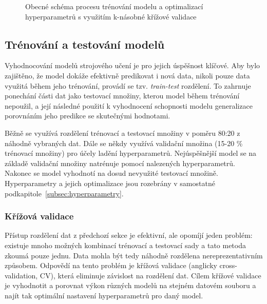 \begin{figure}[!htb]
\begin{center}
        \caption{Obecné schéma procesu trénování modelu a optimalizací
            hyperparametrů s využitím k-násobné křížové
            validace~\cite{crossvalidation}}
        \label{fig:cross-validation}
    \end{center}
\end{figure}


\subsection{Trénování a testování modelů}
Vyhodnocování modelů strojového učení je pro jejich úspěšnost klíčové. Aby bylo
zajištěno, že model dokáže efektivně predikovat i nová data, nikoli pouze data
využitá během jeho trénování, provádí se tzv. \emph{train-test} rozdělení. To
zahrnuje ponechání části dat jako testovací množiny, kterou model během
trénování nepoužil, a její následné použití k vyhodnocení schopnosti modelu
generalizace porovnáním jeho predikce se skutečnými hodnotami.

Běžně se využívá rozdělení trénovací a testovací množiny v poměru 80:20 z
náhodně vybraných dat. Dále se někdy využívá validační množina (15-20 \%
trénovací množiny) pro účely ladění hyperparametrů. Nejúspěšnější model se na
základě validační množiny natrénuje pomocí nalezených hyperparametrů. Nakonec se
model vyhodnotí na dosud nevyužité testovací množině. Hyperparametry a jejich
optimalizace jsou rozebrány v samostatné
podkapitole~\ref{subsec:hyperparametry}.

\subsubsection{Křížová validace} %
Přístup rozdělení dat z předchozí sekce je efektivní, ale opomíjí jeden problém:
existuje mnoho možných kombinací trénovací a testovací sady a tato metoda zkoumá
pouze jednu. Data mohla být tedy náhodně rozdělena nereprezentativním způsobem.
Odpovědí na tento problém je křížová validace (anglicky cross-validation,
\gls{CV}), která eliminuje závislost na rozdělení dat. Cílem křížové validace je
vyhodnotit a porovnat výkon různých modelů na stejném datovém souboru a najít
tak optimální nastavení hyperparametrů pro daný model.

